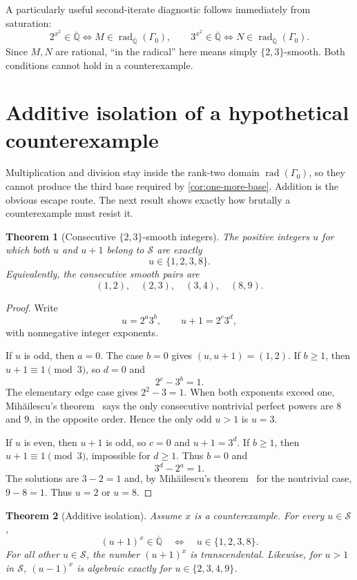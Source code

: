 \documentclass[11pt]{article}
\newtheorem{theorem}{Theorem}[section]
\theoremstyle{definition}
\newcommand{\Qbar}{\overline{\mathbb{Q}}}
\newcommand{\rad}{\operatorname{rad}}
\newcommand{\smooth}{\mathcal{S}}
\newcommand{\Gammao}{\Gamma_0}
\begin{document}
A particularly useful second-iterate diagnostic follows immediately from
saturation:
\[
 \boxed{
  \ 2^{x^2}\in\Qbar
  \iff M\in\rad_{\Qbar}(\Gammao),
  \qquad
  3^{x^2}\in\Qbar
  \iff N\in\rad_{\Qbar}(\Gammao).\ }
\]
Since $M,N$ are rational, ``in the radical'' here means simply
$\{2,3\}$-smooth.  Both conditions cannot hold in a counterexample.

\section{Additive isolation of a hypothetical counterexample}

Multiplication and division stay inside the rank-two domain
$\rad(\Gammao)$, so they cannot produce the third base required by
\cref{cor:one-more-base}.  Addition is the obvious escape route.  The next
result shows exactly how brutally a counterexample must resist it.

\begin{theorem}[Consecutive $\{2,3\}$-smooth integers]
\label{thm:smooth-neighbors}
The positive integers $u$ for which both $u$ and $u+1$ belong to $\smooth$ are
exactly
\[
             u\in\{1,2,3,8\}.
\]
Equivalently, the consecutive smooth pairs are
\[
       (1,2),\quad(2,3),\quad(3,4),\quad(8,9).
\]
\end{theorem}

\begin{proof}
Write
\[
     u=2^a3^b,
     \qquad u+1=2^c3^d,
\]
with nonnegative integer exponents.

If $u$ is odd, then $a=0$.  The case $b=0$ gives $(u,u+1)=(1,2)$.  If
$b\geq1$, then $u+1\equiv1\pmod3$, so $d=0$ and
\[
       2^c-3^b=1.
\]
The elementary edge case gives $2^2-3=1$.  When both exponents exceed one,
Mih\u{a}ilescu's theorem~\cite{Mihailescu} says the only consecutive nontrivial perfect powers
are $8$ and $9$, in the opposite order.  Hence the only odd $u>1$ is $u=3$.

If $u$ is even, then $u+1$ is odd, so $c=0$ and $u+1=3^d$.  If $b\geq1$,
then $u+1\equiv1\pmod3$, impossible for $d\geq1$.  Thus $b=0$ and
\[
       3^d-2^a=1.
\]
The solutions are $3-2=1$ and, by Mih\u{a}ilescu's theorem~\cite{Mihailescu} for the nontrivial
case, $9-8=1$.  Thus $u=2$ or $u=8$.
\end{proof}

\begin{theorem}[Additive isolation]
\label{thm:additive-isolation}
Assume $x$ is a counterexample.  For every $u\in\smooth$,
\[
 (u+1)^x\in\Qbar
 \quad\Longleftrightarrow\quad
 u\in\{1,2,3,8\}.
\]
For all other $u\in\smooth$, the number $(u+1)^x$ is transcendental.
Likewise, for $u>1$ in $\smooth$, $(u-1)^x$ is algebraic exactly for
$u\in\{2,3,4,9\}$.
\end{theorem}
\end{document}
